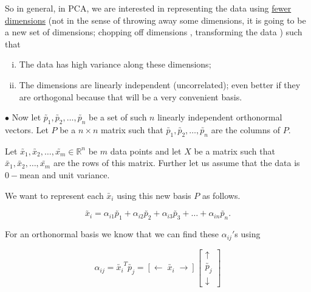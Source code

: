 \documentclass[11pt, a4paper]{article}
\begin{document}
\hspace{0.3cm}

 So in general, in PCA, we are interested in representing the data using \underline{fewer dimensions} (not in the sense of throwing away some dimensions, it is going to be a new set of dimensions; chopping off dimensions  , transforming the data ) such that

\begin{enumerate}[(i)]

\item The data has high variance along these dimensions;

\item The dimensions are linearly independent (uncorrelated); even better if they are orthogonal because that will be a very convenient basis. \\

\end{enumerate}


\vspace{0.3cm}

$\bullet$ Now let $\utilde{p_1}, \utilde{p_2}, \ldots , \utilde{p_n}$ be a set of such $n$ linearly independent orthonormal vectors. Let $P$ be a $n \times n$ matrix such that $\utilde{p_1}, \utilde{p_2}, \ldots , \utilde{p_n}$ are the columns of $P$. \\

\vspace{0.3cm}

Let $\utilde{x_1}, \utilde{x_2}, \ldots , \utilde{x_m} \in \mathbb{R}^n$ be $m$ data points and let $X$ be a matrix such that $\utilde{x_1}, \utilde{x_2}, \ldots , \utilde{x_m}$ are the rows of this matrix. Further let us assume that the data is $0-$mean and unit variance. \\

\vspace{0.3cm}

We want to represent each $\utilde{x_i}$ using this new basis $P$ as follows.

$$\utilde{x_i} = \alpha_{i1} \utilde{p_1} + \alpha_{i2} \utilde{p_2} + \alpha_{i3} \utilde{p_3} + \ldots + \alpha_{in} \utilde{p_n}.$$

For an orthonormal basis we know that we can find these $\alpha_{ij}'$s using

\[
\alpha_{ij} = \utilde{x_i}^T \utilde{p_j} = 
\left[
\leftarrow \; \utilde{x_i} \; \rightarrow
\right]
\begin{bmatrix}
\uparrow \\
\utilde{p_j} \\
\downarrow
\end{bmatrix}
\]
\end{document}
